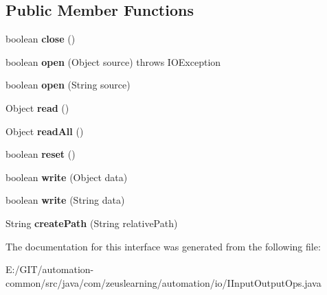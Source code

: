\subsection*{Public Member Functions}
\begin{DoxyCompactItemize}
\item 
\hypertarget{interfacecom_1_1zeuslearning_1_1automation_1_1io_1_1IInputOutputOps_a7624bd3e6283dea841eabe0d7980923d}{}\label{interfacecom_1_1zeuslearning_1_1automation_1_1io_1_1IInputOutputOps_a7624bd3e6283dea841eabe0d7980923d} 
boolean {\bfseries close} ()
\item 
\hypertarget{interfacecom_1_1zeuslearning_1_1automation_1_1io_1_1IInputOutputOps_ab74ee35e292f9e65f93d70d106e670de}{}\label{interfacecom_1_1zeuslearning_1_1automation_1_1io_1_1IInputOutputOps_ab74ee35e292f9e65f93d70d106e670de} 
boolean {\bfseries open} (Object source)  throws I\+O\+Exception
\item 
\hypertarget{interfacecom_1_1zeuslearning_1_1automation_1_1io_1_1IInputOutputOps_aa8457bf52631ab70decf743665a4ebc3}{}\label{interfacecom_1_1zeuslearning_1_1automation_1_1io_1_1IInputOutputOps_aa8457bf52631ab70decf743665a4ebc3} 
boolean {\bfseries open} (String source)
\item 
\hypertarget{interfacecom_1_1zeuslearning_1_1automation_1_1io_1_1IInputOutputOps_a7587ac172b341929f50b0cb9c9f1545d}{}\label{interfacecom_1_1zeuslearning_1_1automation_1_1io_1_1IInputOutputOps_a7587ac172b341929f50b0cb9c9f1545d} 
Object {\bfseries read} ()
\item 
\hypertarget{interfacecom_1_1zeuslearning_1_1automation_1_1io_1_1IInputOutputOps_a0debc1ecf0edfca71da94c338839aff3}{}\label{interfacecom_1_1zeuslearning_1_1automation_1_1io_1_1IInputOutputOps_a0debc1ecf0edfca71da94c338839aff3} 
Object {\bfseries read\+All} ()
\item 
\hypertarget{interfacecom_1_1zeuslearning_1_1automation_1_1io_1_1IInputOutputOps_a617a90e5843d9c4d312f2f652690541b}{}\label{interfacecom_1_1zeuslearning_1_1automation_1_1io_1_1IInputOutputOps_a617a90e5843d9c4d312f2f652690541b} 
boolean {\bfseries reset} ()
\item 
\hypertarget{interfacecom_1_1zeuslearning_1_1automation_1_1io_1_1IInputOutputOps_a6cb50598e30244d00770a761dfc9982d}{}\label{interfacecom_1_1zeuslearning_1_1automation_1_1io_1_1IInputOutputOps_a6cb50598e30244d00770a761dfc9982d} 
boolean {\bfseries write} (Object data)
\item 
\hypertarget{interfacecom_1_1zeuslearning_1_1automation_1_1io_1_1IInputOutputOps_ab5dcbacf519b12a8e14c861827d6d6c7}{}\label{interfacecom_1_1zeuslearning_1_1automation_1_1io_1_1IInputOutputOps_ab5dcbacf519b12a8e14c861827d6d6c7} 
boolean {\bfseries write} (String data)
\item 
\hypertarget{interfacecom_1_1zeuslearning_1_1automation_1_1io_1_1IInputOutputOps_a400626cbb08cf1be9bccf00e88008275}{}\label{interfacecom_1_1zeuslearning_1_1automation_1_1io_1_1IInputOutputOps_a400626cbb08cf1be9bccf00e88008275} 
String {\bfseries create\+Path} (String relative\+Path)
\end{DoxyCompactItemize}


The documentation for this interface was generated from the following file\+:\begin{DoxyCompactItemize}
\item 
E\+:/\+G\+I\+T/automation-\/common/src/java/com/zeuslearning/automation/io/I\+Input\+Output\+Ops.\+java\end{DoxyCompactItemize}
